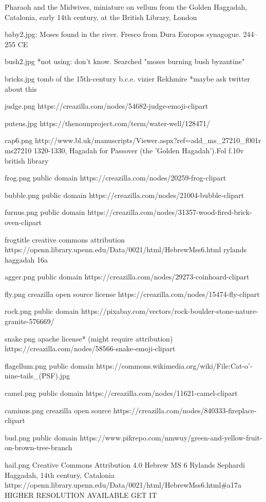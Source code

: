 Pharaoh and the Midwives, miniature on vellum from the Golden Haggadah, Catalonia, early 14th century, at the British Library, London

baby2.jpg:
Moses found in the river. Fresco from Dura Europos synagogue.
244–255 CE

bush2.jpg *not using:
don't know.  Searched "moses burning bush byzantine"

bricks.jpg
tomb of the 15th-century b.c.e. vizier Rekhmire *maybe ask twitter about this

judge.png
https://creazilla.com/nodes/54682-judge-emoji-clipart

puteus.jpg
https://thenounproject.com/term/water-well/128471/

cap6.png
http://www.bl.uk/manuscripts/Viewer.aspx?ref=add_ms_27210_f001r
ms27210 1320-1330, Hagadah for Passover (the 'Golden Hagadah').Fol f.10v
british library 

frog.png
public domain
https://creazilla.com/nodes/20259-frog-clipart

bubble.png
public domain
https://creazilla.com/nodes/21004-bubble-clipart

furnus.png
public domain
https://creazilla.com/nodes/31357-wood-fired-brick-oven-clipart

frogtitle
creative commons attribution
https://openn.library.upenn.edu/Data/0021/html/HebrewMss6.html
rylands haggadah 16a

agger.png
public domain
https://creazilla.com/nodes/29273-coinhoard-clipart

fly.png
creazilla open source license
https://creazilla.com/nodes/15474-fly-clipart

rock.png
public domain
https://pixabay.com/vectors/rock-boulder-stone-nature-granite-576669/

snake.png
apache license* (might require attribution)
https://creazilla.com/nodes/58566-snake-emoji-clipart

flagellum.png
public domain
https://commons.wikimedia.org/wiki/File:Cat-o'-nine-tails_(PSF).jpg

camel.png
public domain
https://creazilla.com/nodes/11621-camel-clipart

caminus.png
creazilla open source
https://creazilla.com/nodes/840333-fireplace-clipart

bud.png
public domain
https://www.pikrepo.com/nmwuy/green-and-yellow-fruit-on-brown-tree-branch

hail.png
Creative Commons Attribution 4.0
Hebrew MS 6 Rylands Sephardi Haggadah, 14th century, Catalonia
https://openn.library.upenn.edu/Data/0021/html/HebrewMss6.html#a17a
HIGHER RESOLUTION AVAILABLE GET IT

